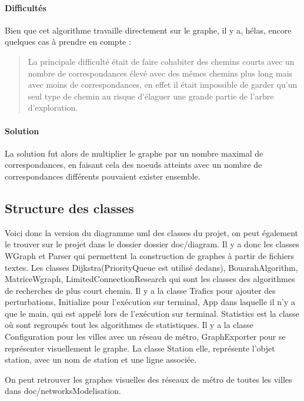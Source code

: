 \documentclass[french, 12pt]{article}
\begin{document}
\paragraph{Difficultés}
Bien que cet algorithme travaille directement sur le graphe, il y a, hélas, encore quelques cas à prendre en compte :

\begin{quote}  
  La principale difficulté était de faire cohabiter des chemins courts avec un nombre de correspondances élevé avec des mêmes chemins plus long mais avec moins de correspondances, en effet il était impossible de garder qu'un seul type de chemin au risque d'élaguer une grande partie de l'arbre d'exploration.
\end{quote}

\paragraph{Solution}
La solution fut alors de multiplier le graphe par un nombre maximal de correspondances, en faisant cela des noeuds atteints avec un nombre de correspondances différents pouvaient exister ensemble.


\newpage
\subsection{Structure des classes}
Voici donc la version du diagramme uml des classes du projet, on peut également le trouver sur le projet dans le dossier dossier doc/diagram. Il y a donc les classes WGraph et Parser qui permettent la construction de graphes à partir de fichiers textes. Les classes Dijkstra(PriorityQueue est utilisé dedans), BouarahAlgorithm, MatriceWgraph, LimitedConnectionResearch qui sont les classes des algorithmes de recherches de plus court chemin. Il y a la classe Trafics pour ajouter des perturbations, Initialize pour l'exécution sur terminal, App dans laquelle il n'y a que le main, qui est appelé lors de l'exécution sur terminal. Statistics est la classe où sont regroupés tout les algorithmes de statistiques. Il y a la classe Configuration pour les villes avec un réseau de métro, GraphExporter pour se représenter visuellement le graphe. La classe Station elle, représente l'objet station, avec un nom de station et une ligne associée.

On peut retrouver les graphes visuelles des réseaux de métro de toutes les villes dans doc/networksModelisation.
\end{document}
